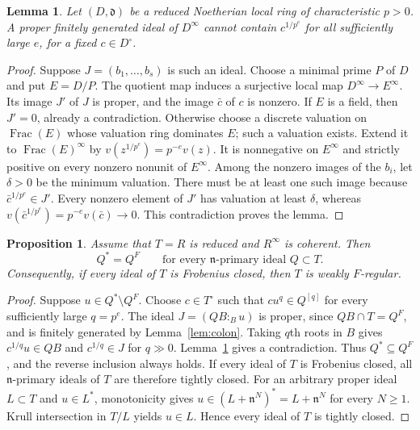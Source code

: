 \documentclass[11pt,a4paper]{amsart}
\numberwithin{equation}{section}
\newtheorem{proposition}[theorem]{Proposition}
\newtheorem{lemma}[theorem]{Lemma}
\newcommand{\Frac}{\operatorname{Frac}}
\newcommand{\fn}{\mathfrak n}
\begin{document}
 \begin{lemma}\label{lem:roots}	Let $(D,\mathfrak d)$ be a reduced Noetherian local ring of	characteristic $p>0$. A proper finitely generated ideal of	$D^\infty$ cannot contain $c^{1/p^e}$ for all sufficiently large
$e$, for a fixed $c\in D^\circ$.
 \end{lemma}
 
 \begin{proof}
 Suppose $J=(b_1,\ldots,b_s)$ is such an ideal. Choose a minimal
 prime $P$ of $D$ and put $E=D/P$. The quotient map induces a	surjective local map $D^\infty\to E^\infty$. Its image $J'$ of	$J$ is proper, and the image $\bar c$ of $c$ is nonzero.	If $E$ is a field, then $J'=0$, already a contradiction.
 Otherwise choose a discrete valuation on $\Frac(E)$ whose
valuation ring dominates $E$; such a valuation exists. Extend it to $\Frac(E)^\infty$ by
$	v(z^{1/p^e})=p^{-e}v(z). $	It is nonnegative on $E^\infty$ and strictly positive on every	nonzero nonunit of $E^\infty$. Among the nonzero images of the	$b_i$, let $\delta>0$ be the minimum valuation. There must be at	least one such image because $\bar c^{1/p^e}\in J'$.	Every nonzero element of $J'$ has valuation at least $\delta$,	whereas
 $v(\bar c^{1/p^e})=p^{-e}v(\bar c)\longrightarrow0.$ This contradiction proves the lemma.
 \end{proof}
 
 \begin{proposition}\label{thm:completion}	Assume that $T=\widehat R$ is reduced and $R^\infty$ is coherent.	Then	$$	Q^*=Q^F	\qquad\text{for every $\fn$-primary ideal $Q\subset T$}.	$$	Consequently, if every ideal of $T$ is Frobenius closed, then $T$	is weakly $F$-regular.
 \end{proposition}
 
 \begin{proof}	Suppose $u\in Q^*\setminus Q^F$. Choose $c\in T^\circ$ such that	$cu^q\in Q^{[q]}$ for every sufficiently large $q=p^e$.	The ideal
 $J=(QB:_B u)$ is proper, since $QB\cap T=Q^F$, and is finitely generated by	Lemma~\ref{lem:colon}. Taking $q$th roots in $B$ gives
$c^{1/q}u\in QB$ and $ c^{1/q}\in J$ for $ q\gg0$.	Lemma~\ref{lem:roots} gives a contradiction. Thus $Q^*\subseteq	Q^F$, and the reverse inclusion always holds.
 If every ideal of $T$ is Frobenius closed, all $\fn$-primary	ideals of $T$ are therefore tightly closed. For an arbitrary	proper ideal $L\subset T$ and $u\in L^*$, monotonicity gives	$ u\in (L+\fn^N)^*=L+\fn^N$ { for every } 	$N\geq1.$	Krull intersection in $T/L$ yields $u\in L$. Hence every ideal
 of $T$ is tightly closed.
 \end{proof}
 
\end{document}
